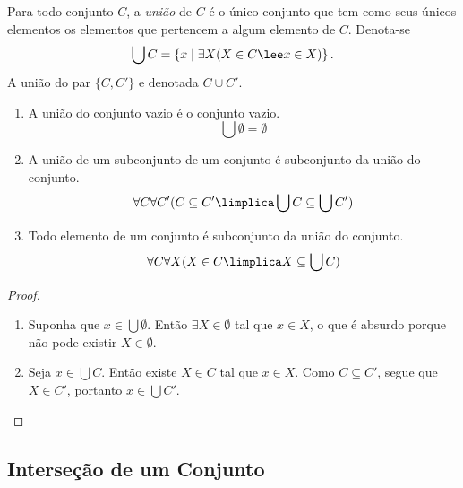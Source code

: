 \begin{defi}
Para todo conjunto $C$, a \emph{união} de $C$ é o único conjunto que tem como seus únicos elementos os elementos que pertencem a algum elemento de $C$. Denota-se
	\begin{equation*}
	\bigcup C = \set{x}{\exists X(X \in C \lee x \in X)}.
	\end{equation*}
A união do par $\{C,C'\}$ e denotada $C \cup C'$.
\end{defi}

\begin{prop}
	\begin{enumerate}
	\item A união do conjunto vazio é o conjunto vazio.
		\begin{equation*}
		\bigcup \emptyset = \emptyset
		\end{equation*}

	\item A união de um subconjunto de um conjunto é subconjunto da união do conjunto.
		\begin{equation*}
		\forall C \forall C' (C \subseteq C' \limplica \bigcup C \subseteq \bigcup C')
		\end{equation*}
	
	\item Todo elemento de um conjunto é subconjunto da união do conjunto.
		\begin{equation*}
		\forall C \forall X (X \in C \limplica X \subseteq \bigcup C)
		\end{equation*}
	\end{enumerate}
\end{prop}
\begin{proof}
	\begin{enumerate}
	\item Suponha que $x \in \bigcup \emptyset$. Então $\exists X \in \emptyset$ tal que $x \in X$, o que é absurdo porque não pode existir $X \in \emptyset$.
	
	\item Seja $x \in \bigcup C$. Então existe $X \in C$ tal que $x \in X$. Como $C \subseteq C'$, segue que $X \in C'$, portanto $x \in \bigcup C'$. \qedhere
	\end{enumerate}
\end{proof}

\subsection{Interseção de um Conjunto}

